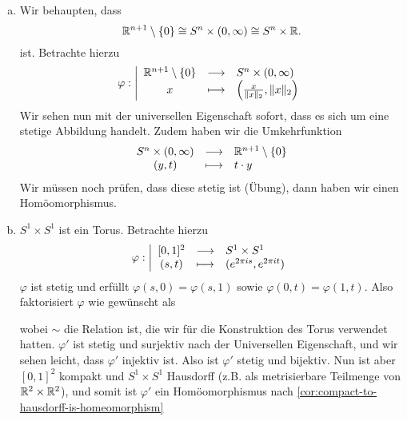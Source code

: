 \begin{example}
    \begin{enumerate}[a)]
        \item Wir behaupten, dass
            \[
                \mathbb{R}^{n+1} \setminus \left \{0\right\} \cong S^n \times (0,\infty) \cong S^n \times \mathbb{R}
            .\] 
            ist. Betrachte hierzu
                \begin{equation*}
                \varphi : \left| \begin{array}{c c l} 
                    \mathbb{R}^{n+1}\setminus \left \{0\right\}  & \longrightarrow & S^n\times (0,\infty) \\
                    x & \longmapsto &  \left( \frac{x}{\lVert x \rVert _2}, \lVert x \rVert _2 \right) 
                \end{array} \right.
            \end{equation*}
            Wir sehen nun mit der universellen Eigenschaft sofort, dass es sich um eine stetige Abbildung handelt. Zudem haben wir die Umkehrfunktion
                \begin{equation*}
                \begin{array}{c c l} 
                    S^n \times (0,\infty) & \longrightarrow & \mathbb{R}^{n+1}\setminus \left \{0\right\}  \\
                    (y,t) & \longmapsto &  t\cdot y
                \end{array}
            \end{equation*}
            Wir müssen noch prüfen, dass diese stetig ist (Übung), dann haben wir einen Homöomorphismus.
        \item $S^1\times S^1$ ist ein Torus. Betrachte hierzu
               \begin{equation*}
               \varphi : \left| \begin{array}{c c l} 
                   [0,1]^2 & \longrightarrow & S^1 \times S^1 \\
                   (s,t) & \longmapsto &  (e^{2\pi is}, e^{2\pi it})
               \end{array} \right.
           \end{equation*}
           $\varphi $ ist stetig und erfüllt $\varphi (s,0) = \varphi (s,1)$ sowie $\varphi (0,t) = \varphi (1,t)$. Also faktorisiert $\varphi $ wie gewünscht als
           wobei $\sim $ die Relation ist, die wir für die Konstruktion des Torus verwendet hatten. $\varphi '$ ist stetig und surjektiv nach der Universellen Eigenschaft, und wir sehen leicht, dass $\varphi '$ injektiv ist. Also ist $\varphi '$ stetig und bijektiv. Nun ist aber $[0,1]^2$ kompakt und $S^1 \times S^1$ Hausdorff (z.B. als metrisierbare Teilmenge von $\mathbb{R}^2 \times \mathbb{R}^2$), und somit ist $\varphi '$ ein Homöomorphismus nach \autoref{cor:compact-to-hausdorff-is-homeomorphism}
    \end{enumerate}
\end{example}
